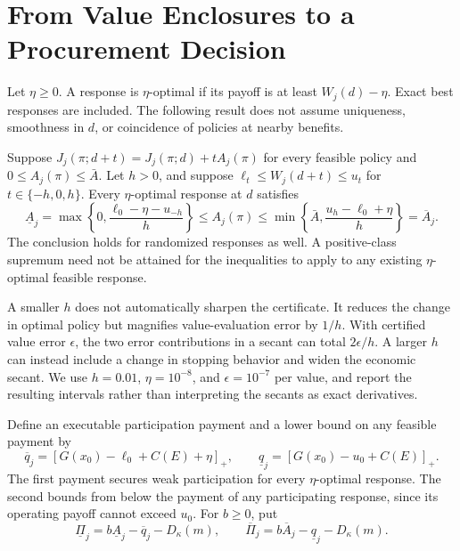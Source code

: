 \section{From Value Enclosures to a Procurement Decision}
\label{sec:r12_service}
Let $\eta\geq0$. A response is $\eta$-optimal if its payoff is at least $W_j(d)-\eta$. Exact best responses are included. The following result does not assume uniqueness, smoothness in $d$, or coincidence of policies at nearby benefits.

\begin{proposition}
\label{prop:r12_service}
Suppose $J_j(\pi;d+t)=J_j(\pi;d)+tA_j(\pi)$ for every feasible policy and $0\leq A_j(\pi)\leq\bar A$. Let $h>0$, and suppose
$\ell_t\leq W_j(d+t)\leq u_t$ for $t\in\{-h,0,h\}$. Every $\eta$-optimal response at $d$ satisfies
\begin{equation}
 \underline A_j=\max\left\{0,\frac{\ell_0-\eta-u_{-h}}h\right\}
 \leq A_j(\pi)\leq
 \min\left\{\bar A,\frac{u_h-\ell_0+\eta}h\right\}
 =\overline A_j.
 \label{eq:r12_service_bounds}
\end{equation}
The conclusion holds for randomized responses as well. A positive-class supremum need not be attained for the inequalities to apply to any existing $\eta$-optimal feasible response.
\end{proposition}

A smaller $h$ does not automatically sharpen the certificate. It reduces the change in optimal policy but magnifies value-evaluation error by $1/h$. With certified value error $\epsilon$, the two error contributions in a secant can total $2\epsilon/h$. A larger $h$ can instead include a change in stopping behavior and widen the economic secant. We use $h=0.01$, $\eta=10^{-8}$, and $\epsilon=10^{-7}$ per value, and report the resulting intervals rather than interpreting the secants as exact derivatives.

Define an executable participation payment and a lower bound on any feasible payment by
\begin{equation}
 \overline q_j=[G(x_0)-\ell_0+C(E)+\eta]_+,
 \qquad \underline q_j=[G(x_0)-u_0+C(E)]_+.
 \label{eq:r12_payment_bounds}
\end{equation}
The first payment secures weak participation for every $\eta$-optimal response. The second bounds from below the payment of any participating response, since its operating payoff cannot exceed $u_0$. For $b\geq0$, put
\begin{equation}
 \underline\Pi_j=b\underline A_j-\overline q_j-D_\kappa(m),\qquad
 \overline\Pi_j=b\overline A_j-\underline q_j-D_\kappa(m).
 \label{eq:r12_surplus_bounds}
\end{equation}

